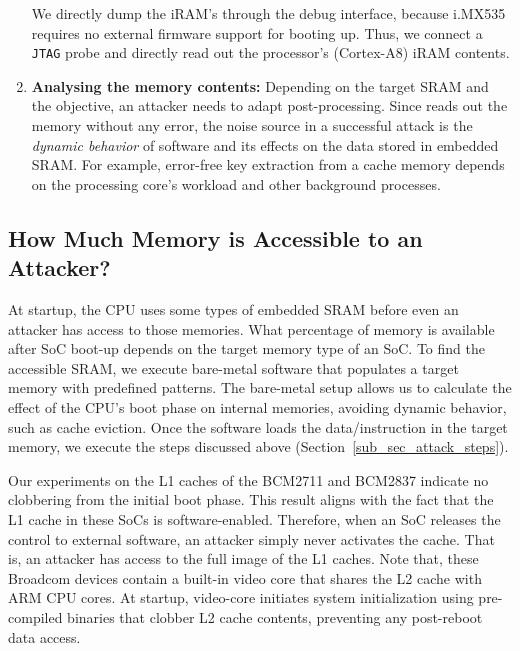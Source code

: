 \begin{enumerate}
    We directly dump the iRAM's through the debug interface, because i.MX535 requires no external firmware support for booting up.
    Thus, we connect a \texttt{JTAG} probe and directly read out the processor's (Cortex-A8) iRAM contents.
    
    \item \textbf{Analysing the memory contents:} Depending on the target SRAM and the objective, an attacker needs to adapt post-processing. 
    Since \sys{} reads out the memory without any error, the noise source in a successful attack is the \textit{dynamic behavior} of software and its effects on the data stored in embedded SRAM. 
    For example, error-free key extraction from a cache memory depends on the processing core's workload and other background processes.

\end{enumerate}

\subsection{How Much Memory is Accessible to an Attacker?}
\label{subsec_post_reboot_memory_props}

At startup, the CPU uses some types of embedded SRAM before even an attacker has access to those memories. 
What percentage of memory is available after SoC boot-up depends on the target memory type of an SoC. 
To find the accessible SRAM, we execute bare-metal software that populates a target memory with predefined patterns. 
The bare-metal setup allows us to calculate the effect of the CPU's boot phase on internal memories, avoiding dynamic behavior, such as cache eviction.
Once the software loads the data/instruction in the target memory, we execute the steps discussed above (Section~\ref{sub_sec_attack_steps}).

Our experiments on the L1 caches of the BCM2711 and BCM2837 indicate no clobbering from the initial boot phase.
This result aligns with the fact that the L1 cache in these SoCs is software-enabled.
Therefore, when an SoC releases the control to external software, an attacker simply never activates the cache.   
That is, an attacker has access to the full image of the L1 caches. 
Note that, these Broadcom devices contain a built-in video core that shares the L2 cache with ARM CPU cores. 
At startup, video-core initiates system initialization using pre-compiled binaries that clobber L2 cache contents, preventing any post-reboot data access. 

